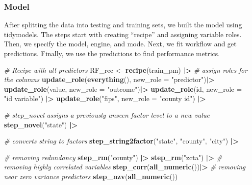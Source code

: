 \documentclass[
]{article}
\newenvironment{Shaded}{\begin{snugshade}}{\end{snugshade}}
\newcommand{\AttributeTok}[1]{\textcolor[rgb]{0.13,0.29,0.53}{#1}}
\newcommand{\CommentTok}[1]{\textcolor[rgb]{0.56,0.35,0.01}{\textit{#1}}}
\newcommand{\FunctionTok}[1]{\textcolor[rgb]{0.13,0.29,0.53}{\textbf{#1}}}
\newcommand{\NormalTok}[1]{#1}
\newcommand{\OtherTok}[1]{\textcolor[rgb]{0.56,0.35,0.01}{#1}}
\newcommand{\SpecialCharTok}[1]{\textcolor[rgb]{0.81,0.36,0.00}{\textbf{#1}}}
\newcommand{\StringTok}[1]{\textcolor[rgb]{0.31,0.60,0.02}{#1}}
\begin{document}
\subsubsection{Model}\label{model}

After splitting the data into testing and training sets, we built the
model using tidymodels. The steps start with creating ``recipe'' and
assigning variable roles. Then, we specify the model, engine, and mode.
Next, we fit workflow and get predictions. Finally, we use the
predictions to find performance metrics.

\begin{Shaded}
\begin{Highlighting}[]
\CommentTok{\# Recipe with all predictors}
\NormalTok{RF\_rec }\OtherTok{\textless{}{-}} \FunctionTok{recipe}\NormalTok{(train\_pm) }\SpecialCharTok{|\textgreater{}}
    \CommentTok{\# assign roles for the columns}
    \FunctionTok{update\_role}\NormalTok{(}\FunctionTok{everything}\NormalTok{(), }\AttributeTok{new\_role =} \StringTok{"predictor"}\NormalTok{)}\SpecialCharTok{|\textgreater{}}
    \FunctionTok{update\_role}\NormalTok{(value, }\AttributeTok{new\_role =} \StringTok{"outcome"}\NormalTok{)}\SpecialCharTok{|\textgreater{}}
    \FunctionTok{update\_role}\NormalTok{(id, }\AttributeTok{new\_role =} \StringTok{"id variable"}\NormalTok{) }\SpecialCharTok{|\textgreater{}}
    \FunctionTok{update\_role}\NormalTok{(}\StringTok{"fips"}\NormalTok{, }\AttributeTok{new\_role =} \StringTok{"county id"}\NormalTok{) }\SpecialCharTok{|\textgreater{}}
    
    \CommentTok{\# step\_novel assigns a previously unseen factor level to a new value }
    \FunctionTok{step\_novel}\NormalTok{(}\StringTok{"state"}\NormalTok{) }\SpecialCharTok{|\textgreater{}}

    \CommentTok{\# converts string to factors}
    \FunctionTok{step\_string2factor}\NormalTok{(}\StringTok{"state"}\NormalTok{, }\StringTok{"county"}\NormalTok{, }\StringTok{"city"}\NormalTok{) }\SpecialCharTok{|\textgreater{}}
  
    \CommentTok{\# removing redundancy}
    \FunctionTok{step\_rm}\NormalTok{(}\StringTok{"county"}\NormalTok{) }\SpecialCharTok{|\textgreater{}}
    \FunctionTok{step\_rm}\NormalTok{(}\StringTok{"zcta"}\NormalTok{) }\SpecialCharTok{|\textgreater{}}
    \CommentTok{\# removing highly correlated variables}
    \FunctionTok{step\_corr}\NormalTok{(}\FunctionTok{all\_numeric}\NormalTok{())}\SpecialCharTok{|\textgreater{}}
    \CommentTok{\# removing near zero variance predictors}
    \FunctionTok{step\_nzv}\NormalTok{(}\FunctionTok{all\_numeric}\NormalTok{())}
\end{Highlighting}
\end{Shaded}
\end{document}
